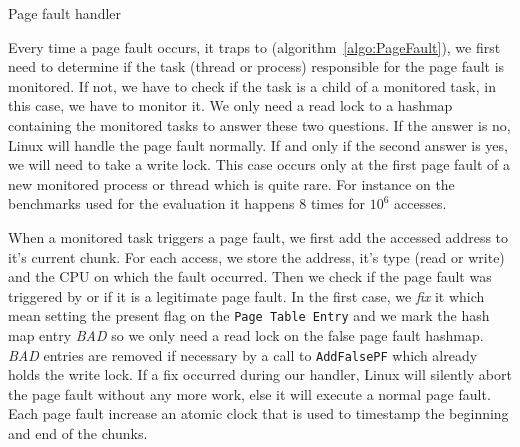 \begin{algorithm}[htb]
    \caption{Page fault handler}
    \label{algo:PageFault}
    \begin{algorithmic}[1]
                    \State \Return {}
                \EndIf
            \EndIf
            \State {}
            \State {}
            \State {}
            \State {}
            \State {}
            \State {}
        \EndFunction
    \end{algorithmic}
\end{algorithm}

Every time a page fault occurs, it traps to \Moca
(algorithm~\ref{algo:PageFault}), we first need to determine if the task
(thread or process) responsible for the page fault is
monitored. If not, we have to check if the task is a child of a monitored
task, in this case, we have to monitor it. We only need a read lock
to a hashmap containing the monitored tasks to answer these
two questions. If the answer is no, Linux will handle the page
fault normally. If and only if the second answer is yes, we will need to take
a write lock. This case occurs only at the first page fault of a new monitored
process or thread which is quite rare. For instance on the benchmarks used for
the evaluation it happens $8$ times for $10^6$ accesses.

When a monitored task triggers a page fault, we first add the accessed address
to it's current chunk. For each access, we store the address, it's type (read
or write) and the CPU on which the fault occurred.  Then we check if the page
fault was triggered by \Moca or if it is a legitimate page fault. In the first
case, we \emph{fix} it which mean setting the present flag on the \texttt{Page
Table Entry} and we mark the hash map entry \emph{BAD} so we only need a read
lock on the false page fault hashmap. \emph{BAD} entries are removed if
necessary by a call to \texttt{AddFalsePF} which already holds the write lock.
If a fix occurred during our handler, Linux will silently abort the page fault
without any more work, else it will execute a normal page fault. Each page
fault increase an atomic clock that is used to timestamp the beginning and end
of the chunks.

